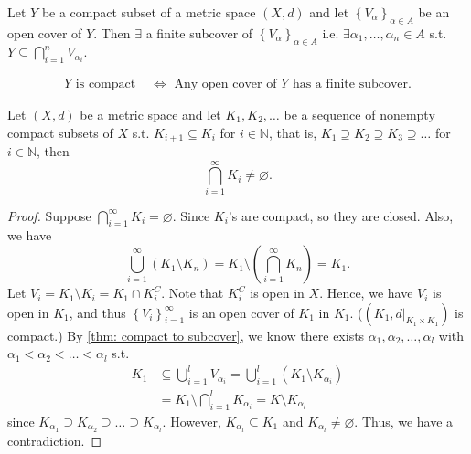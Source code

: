 \begin{theorem}
    Let \(Y\) be a compact subset of a metric space \((X, d)\) and let \(\left\{ V_\alpha  \right\}_{\alpha \in A} \) be an open cover of \(Y\). Then \(\exists \) a finite subcover of \(\left\{ V_\alpha  \right\}_{\alpha \in A} \) i.e. \(\exists \alpha _1, \dots ,\alpha _n \in A\) s.t. \(Y \subseteq \bigcap_{i=1}^{n} V_{\alpha _i}. \)        
\end{theorem}

\begin{remark}
    \begin{align*}
        Y \text{ is compact } &\iff \text{ Any open cover of } Y \text{ has a finite subcover.}
    \end{align*}
\end{remark}

\begin{corollary}
    Let \((X, d)\) be a metric space and let \(K_1, K_2, \dots \) be a sequence of nonempty compact subsets of \(X\) s.t. \(K_{i+1} \subseteq K_i\) for \(i \in \mathbb{N} \), that is, \(K_1 \supseteq K_2 \supseteq K_3 \supseteq \dots  \) for \(i \in \mathbb{N} \), then 
    \[
        \bigcap_{i=1}^{\infty} K_i \neq \varnothing. 
    \]       
\end{corollary}
\begin{proof}
    Suppose \(\bigcap_{i=1}^{\infty} K_i = \varnothing  \). Since \(K_i\)'s are compact, so they are closed. Also, we have 
    \[
        \bigcup_{i=1}^{\infty} \left( K_1 \setminus K_n \right) = K_1 \setminus \left( \bigcap_{i=1}^{\infty} K_n \right) = K_1.
    \]  
    Let \(V_i = K_1 \setminus K_i = K_1 \cap K_i^C\). Note that \(K_i^C\) is open in \(X\). Hence, we have \(V_i\) is open in \(K_1\), and thus \(\left\{ V_i \right\}_{i=1}^{\infty}  \) is an open cover of \(K_1\) in \(K_1\). (\((K_1, d\vert_{K_1 \times K_1})\) is compact.) By \autoref{thm: compact to subcover}, we know there exists \(\alpha _1, \alpha _2, \dots , \alpha _l\) with \(\alpha _1 < \alpha _2 < \dots < \alpha _l\) s.t. 
    \begin{align*}
        K_1 &\subseteq \bigcup_{i=1}^{l} V_{\alpha _i} = \bigcup_{i=1}^{l} \left( K_1 \setminus K_{\alpha _i} \right) \\
            &= K_1 \setminus \bigcap_{i=1}^l K_{\alpha _i} = K \setminus K_{\alpha _l} 
    \end{align*} since \(K_{\alpha _1} \supseteq K_{\alpha _2} \supseteq \dots \supseteq K_{\alpha _l}\). However, \(K_{\alpha _l} \subseteq K_1\) and \(K_{\alpha _l} \neq \varnothing \). Thus, we have a contradiction.  
\end{proof}

